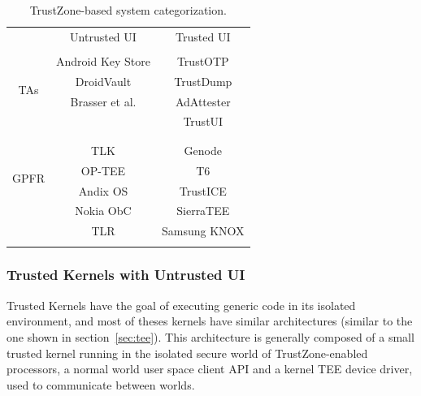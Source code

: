
\begin{table}[t!]
	\caption{TrustZone-based system categorization.}
	\label{tab:trustzonesystemscomparison}
	\centering
	\begin{tabular}{ c|c|c| }
		\multicolumn{1}{c}{} 	& \multicolumn{1}{c}{Untrusted UI} 	& \multicolumn{1}{c}{Trusted UI} \\ \cline{2-3}
		\multirow{5}{*}{TAs} 	&									& \\
		& Android Key Store					& TrustOTP \\
		& DroidVault 						& TrustDump \\
		& Brasser et al.					& AdAttester \\
		& 									& TrustUI \\
		&									& \\
		\cline{2-3}
		\multirow{5}{*}{GPFR}	&									& \\
		& TLK								& Genode \\
		& OP-TEE 							& T6 \\
		& Andix OS							& TrustICE \\
		& Nokia ObC							& SierraTEE \\
		& TLR 								& Samsung KNOX \\
		&									& \\
		\cline{2-3}
	\end{tabular}
\end{table}

\subsubsection{Trusted Kernels with Untrusted UI}

Trusted Kernels have the goal of executing generic code in its isolated environment, and most of theses kernels have similar architectures (similar to the one shown in section~\ref{sec:tee}). This architecture is generally composed of a small trusted kernel running in the isolated secure world of TrustZone-enabled processors, a normal world user space client API and a kernel TEE device driver, used to communicate between worlds.

